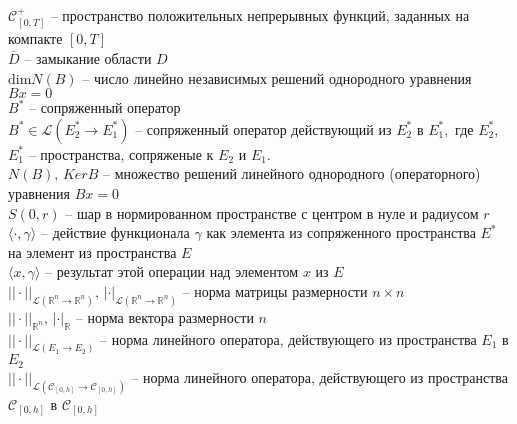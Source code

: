 \noindent $\mathcal{C}_{[0,T]}^{+} $ --  пространство  положительных непрерывных функций, заданных на компакте  $[0,T]$\\

\noindent ${\overline{D}}$ -- замыкание области $D$\\


\noindent $\text{dim} N(B)$ -- число линейно независимых решений однородного уравнения  $Bx=0$\\ 

\noindent $B^*$ -- сопряженный оператор\\

\noindent $B^* \in \mathcal{L}(E_2^* \rightarrow  E_1^*) $ --  сопряженный оператор
действующий  из $E_2^* $ в $E_1^*,$ где $E_2^*,$ $E_1^*$ -- пространства, сопряженые к $E_2$ и $E_1.$\\

\noindent $N(B), \, Ker B$  -- множество решений  линейного однородного (операторного)  уравнения $B x=0$\\

\noindent  $S(0,r)$ -- шар в нормированном пространстве с центром в нуле и радиусом $r$\\

\noindent $\langle \cdot , \gamma\rangle $ -- действие функционала $\gamma$
как элемента из сопряженного пространства $E^*$ на элемент из пространства $E$\\


\noindent $\langle x , \gamma\rangle $ -- результат этой операции над элементом $x$ из $E$\\


\noindent$||\cdot||_{\mathcal{L}(\mathbb{R}^n \rightarrow \mathbb{R}^n )}, \,  |\cdot|_{\mathcal{L}(\mathbb{R}^n \rightarrow \mathbb{R}^n )}$ -- норма матрицы размерности $n \times n$\\

\noindent$||\cdot||_{\mathbb{R}^n}, \,  |\cdot|_{\mathbb{R}}$ -- норма вектора размерности $n$\\

\noindent$|| \cdot ||_{\mathcal{L}(E_1\rightarrow E_2)} $ -- норма линейного оператора, действующего из пространства $E_1$ в $E_2$ \\

\noindent$|| \cdot ||_{\mathcal{L}({\mathcal{C}_{[0,h]}}\rightarrow {\mathcal{C}_{[0,h]}})} $ -- норма линейного оператора, действующего из пространства ${\mathcal{C}_{[0,h]}}$ в ${\mathcal{C}_{[0,h]}}$ \\

